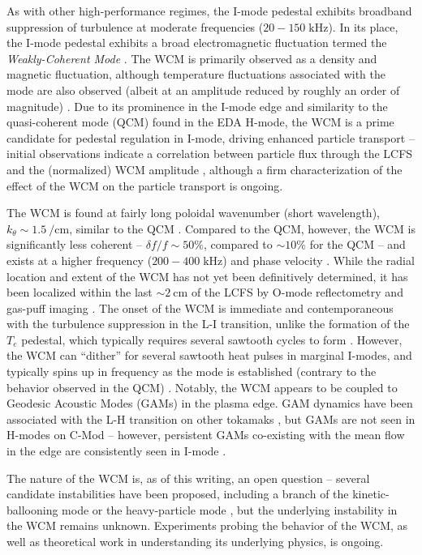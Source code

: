 As with other high-performance regimes, the I-mode pedestal exhibits broadband suppression of turbulence at moderate frequencies ($20-150\;\si{\kilo\hertz}$).  In its place, the I-mode pedestal exhibits a broad electromagnetic fluctuation termed the \emph{Weakly-Coherent Mode} \cite{Whyte2010}.  The WCM is primarily observed as a density and magnetic fluctuation, although temperature fluctuations associated with the mode are also observed (albeit at an amplitude reduced by roughly an order of magnitude) \cite{Cziegler2013,Dominguez2012,White2011}.  Due to its prominence in the I-mode edge and similarity to the quasi-coherent mode (QCM) found in the EDA H-mode, the WCM is a prime candidate for pedestal regulation in I-mode, driving enhanced particle transport -- initial observations indicate a correlation between particle flux through the LCFS and the (normalized) WCM amplitude \cite{Dominguez2012}, although a firm characterization of the effect of the WCM on the particle transport is ongoing.

The WCM is found at fairly long poloidal wavenumber (short wavelength), $k_\theta \sim \SI{1.5}{\per\centi\meter}$, similar to the QCM \cite{Dominguez2012}.  Compared to the QCM, however, the WCM is significantly less coherent -- $\delta f/f \sim 50\%$, compared to $\sim 10\%$ for the QCM -- and exists at a higher frequency ($200-400\;\si{\kilo\hertz}$) and phase velocity \cite{Hubbard2011,Cziegler2013}.  While the radial location and extent of the WCM has not yet been definitively determined, it has been localized within the last $\sim \SI{2}{\centi\meter}$ of the LCFS by O-mode reflectometry \cite{Dominguez2012} and gas-puff imaging \cite{Cziegler2011,Cziegler2013}.  The onset of the WCM is immediate and contemporaneous with the turbulence suppression in the L-I transition, unlike the formation of the $T_e$ pedestal, which typically requires several sawtooth cycles to form \cite{Cziegler2011}.  However, the WCM can ``dither'' for several sawtooth heat pulses in marginal I-modes, and typically spins up in frequency as the mode is established (contrary to the behavior observed in the QCM) \cite{Cziegler2011,Hubbard2011}.  Notably, the WCM appears to be coupled to Geodesic Acoustic Modes (GAMs) \cite{Winsor1968} in the plasma edge.  GAM dynamics have been associated with the L-H transition on other tokamaks \cite{Schmitz2012,Manz2012}, but GAMs are not seen in H-modes on C-Mod -- however, persistent GAMs co-existing with the mean flow in the edge are consistently seen in I-mode \cite{Cziegler2013}.

The nature of the WCM is, as of this writing, an open question -- several candidate instabilities have been proposed, including a branch of the kinetic-ballooning mode \cite{Tang1980} or the heavy-particle mode \cite{Coppi2012,Coppi2012a}, but the underlying instability in the WCM remains unknown.  Experiments probing the behavior of the WCM, as well as theoretical work in understanding its underlying physics, is ongoing.\nicechapterending



